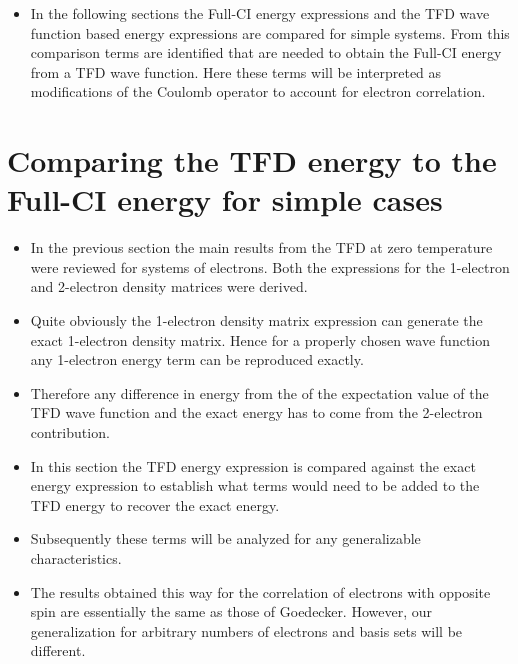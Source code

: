 \documentclass[aip,graphicx]{revtex4-1}
\begin{document}
\begin{itemize}
    \item In the following sections the Full-CI energy expressions and the TFD wave function based energy expressions are compared for simple systems. From this comparison terms are identified that are needed to obtain the Full-CI energy from a TFD wave function. Here these terms will be interpreted as modifications of the Coulomb operator to account for electron correlation. 
\end{itemize}

\section{Comparing the TFD energy to the Full-CI energy for simple cases}
\label{comparisonfullci}

\begin{itemize}
    \item In the previous section the main results from the TFD at zero temperature were reviewed for systems of electrons. Both the expressions for the 1-electron and 2-electron density matrices were derived. 
    \item Quite obviously the 1-electron density matrix expression can generate the exact 1-electron density matrix. Hence for a properly chosen wave function any 1-electron energy term can be reproduced exactly.
    \item Therefore any difference in energy from the of the expectation value of the TFD wave function and the exact energy has to come from the 2-electron contribution. 
    \item In this section the TFD energy expression is compared against the exact energy expression to establish what terms would need to be added to the TFD energy to recover the exact energy.
    \item Subsequently these terms will be analyzed for any generalizable characteristics.
    \item The results obtained this way for the correlation of electrons with opposite spin are essentially the same as those of Goedecker. However, our generalization for arbitrary numbers of electrons and basis sets will be different.
\end{itemize}
\end{document}
